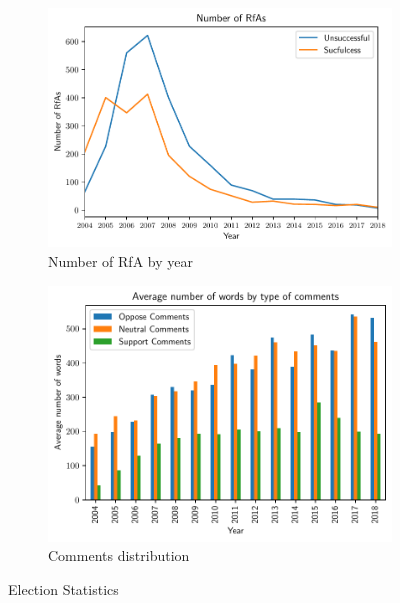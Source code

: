 \begin{figure}[!ht]
    \begin{subfigure}{0.49\textwidth}
        \centering
        \includegraphics[width=\textwidth]{images/num_rfas.pdf}
        \caption{Number of RfA by year}
        \label{fig:num-rfas}
    \end{subfigure}
    \begin{subfigure}{0.49\textwidth}
        \centering
        \includegraphics[width=\textwidth]{images/avg_comment_size_type.pdf}
        \caption{Comments distribution}
        \label{fig:comment-distribution}
    \end{subfigure}
    \caption{Election Statistics}
    \label{fig:Election-stats}
\end{figure}
\clearpage
